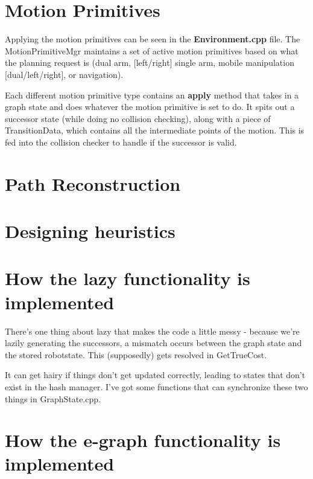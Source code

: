 \documentclass{article}
\begin{document}
\section{Motion Primitives}
Applying the motion primitives can be seen in the \textbf{Environment.cpp}
file. The MotionPrimitiveMgr maintains a set of active motion primitives based
on what the planning request is (dual arm, [left/right] single arm, mobile
manipulation [dual/left/right], or navigation). 

Each different motion primitive type contains an \textbf{apply} method that
takes in a graph state and does whatever the motion primitive is set to do. It
spits out a successor state (while doing no collision checking), along with a
piece of TransitionData, which contains all the intermediate points of the
motion. This is fed into the collision checker to handle if the successor is
valid.

\section{Path Reconstruction}
\section{Designing heuristics}
\section{How the lazy functionality is implemented}
There's one thing about lazy that makes the code a little messy - because we're
lazily generating the successors, a mismatch occurs between the graph state and
the stored robotstate. This (supposedly) gets resolved in GetTrueCost. 

It can get hairy if things don't get updated correctly,
leading to states that don't exist in the hash manager. I've got some functions
that can synchronize these two things in GraphState.cpp.

\section{How the e-graph functionality is implemented}
\end{document}
